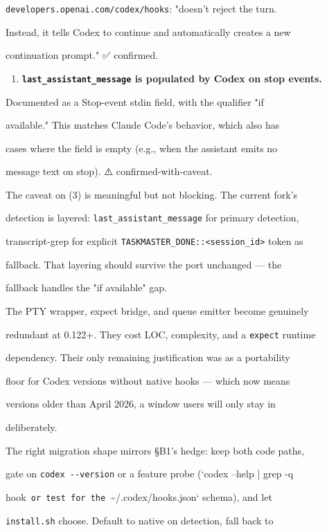 \documentclass[twocolumn,10pt,letterpaper]{article}
\begin{document}
   \texttt{developers.openai.com/\allowbreak codex/\allowbreak hooks}: "doesn't reject the turn.

   Instead, it tells Codex to continue and automatically creates a new

   continuation prompt." ✅ confirmed.


\begin{enumerate}
\setlength{\itemsep}{0pt}
\setlength{\parskip}{0pt}
  \item \textbf{\texttt{last\_assistant\_message} is populated by Codex on stop events.}
\end{enumerate}
   Documented as a Stop-event stdin field, with the qualifier "if

   available." This matches Claude Code's behavior, which also has

   cases where the field is empty (e.g., when the assistant emits no

   message text on stop). ⚠️ confirmed-with-caveat.


The caveat on (3) is meaningful but not blocking. The current fork's

detection is layered: \texttt{last\_assistant\_message} for primary detection,

transcript-grep for explicit \texttt{TASKMASTER\_DONE::<session\_id>} token as

fallback. That layering should survive the port unchanged — the

fallback handles the "if available" gap.


The PTY wrapper, expect bridge, and queue emitter become genuinely

redundant at 0.122+. They cost LOC, complexity, and a \texttt{expect} runtime

dependency. Their only remaining justification was as a portability

floor for Codex versions without native hooks — which now means

versions older than April 2026, a window users will only stay in

deliberately.


The right migration shape mirrors §B1's hedge: keep both code paths,

gate on \texttt{codex -\allowbreak -\allowbreak version} or a feature probe (`codex --help | grep -q

hook\texttt{ or test for the }\textasciitilde{}/.codex/hooks.json` schema), and let

\texttt{install.sh} choose. Default to native on detection, fall back to
\end{document}
